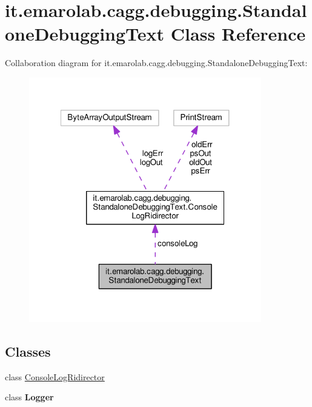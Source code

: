 \hypertarget{classit_1_1emarolab_1_1cagg_1_1debugging_1_1StandaloneDebuggingText}{\section{it.\-emarolab.\-cagg.\-debugging.\-Standalone\-Debugging\-Text Class Reference}
\label{classit_1_1emarolab_1_1cagg_1_1debugging_1_1StandaloneDebuggingText}
}


Collaboration diagram for it.\-emarolab.\-cagg.\-debugging.\-Standalone\-Debugging\-Text\-:\nopagebreak
\begin{figure}[H]
\begin{center}
\leavevmode
\includegraphics[width=287pt]{classit_1_1emarolab_1_1cagg_1_1debugging_1_1StandaloneDebuggingText__coll__graph}
\end{center}
\end{figure}
\subsection*{Classes}
\begin{DoxyCompactItemize}
\item 
class \hyperlink{classit_1_1emarolab_1_1cagg_1_1debugging_1_1StandaloneDebuggingText_1_1ConsoleLogRidirector}{Console\-Log\-Ridirector}
\item 
class {\bfseries Logger}
\end{DoxyCompactItemize}

